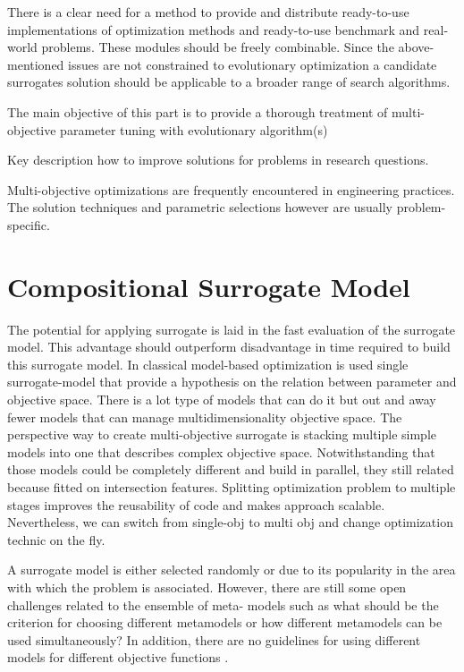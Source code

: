     There is a clear need for a method to provide and distribute ready-to-use implementations of optimization methods and ready-to-use benchmark and real-world problems. 
    These modules should be freely combinable. Since the above- mentioned issues are not constrained to evolutionary optimization a candidate surrogates solution should be applicable to a broader range of search algorithms.

    The main objective of this part is to provide a thorough treatment of multi-objective parameter tuning with evolutionary algorithm(s)

    Key description how to improve solutions for problems in research questions.

    Multi-objective optimizations are frequently encountered in engineering practices. The solution techniques and parametric selections however are usually problem-specific. \cite{abs181207958}

    \section{Compositional Surrogate Model}

        The potential for applying surrogate is laid in the fast evaluation of the surrogate model. This advantage should outperform disadvantage in time required to build this surrogate model. In classical model-based optimization is used single surrogate-model that provide a hypothesis on the relation between parameter and objective space. There is a lot type of models that can do it but out and away fewer models that can manage multidimensionality objective space. The perspective way to create multi-objective surrogate is stacking multiple simple models into one that describes complex objective space. Notwithstanding that those models could be completely different and build in parallel, they still related because fitted on intersection features.
        Splitting optimization problem to multiple stages improves the reusability of code and makes approach scalable. Nevertheless, we can switch from single-obj to multi obj and change optimization technic on the fly.


        A surrogate model is either selected randomly or due to its popularity in the area with which the problem is associated.  However, there are still some open challenges related to the ensemble of meta- models such as what should be the criterion for choosing different metamodels or how different metamodels can be used simultaneously? In addition, there are no guidelines for using different models for different objective functions \cite{SoftSurvey}.

